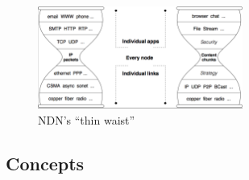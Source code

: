             \begin{figure}[H]
                \begin{center}
                    \includegraphics[width=0.6\textwidth]{fig/ndn_hourglass2.png}
                  \caption{NDN's ``thin waist''}
                  \label{ndn-hourglass2}
                \end{center}
            \end{figure}

        \subsection{Concepts}
